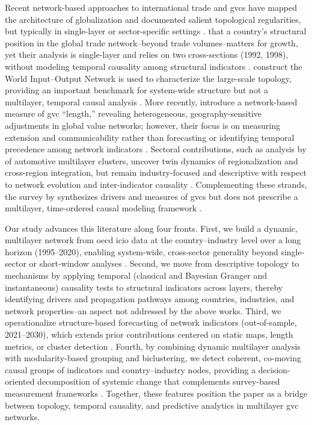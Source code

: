 \documentclass[preprint, 3p,
authoryear]{elsarticle} %
\begin{document}
Recent network-based approaches to international trade and \glspl{gvc}
have mapped the architecture of globalization and documented salient
topological regularities, but typically in single-layer or
sector-specific settings \citep{liu2025spatial}.
\citet{kali2007architecture} that a country's structural position in the
global trade network--beyond trade volumes--matters for growth, yet
their analysis is single-layer and relies on two cross-sections (1992,
1998), without modeling temporal causality among structural indicators
\citep{kali2007architecture}. \citet{cerina2015world} construct the
World Input--Output Network is used to characterize the large-scale
topology, providing an important benchmark for system-wide structure but
not a multilayer, temporal causal analysis \citep{cerina2015world}. More
recently, \citet{piccardi2024patterns} introduce a network-based measure
of \gls{gvc} ``length,'' revealing heterogeneous, geography-sensitive
adjustments in global value networks; however, their focus is on
measuring extension and communicability rather than forecasting or
identifying temporal precedence among network indicators
\citep{piccardi2024patterns}. Sectoral contributions, such as analysis
by \citet{russo2023regionalisation} of automotive multilayer clusters,
uncover twin dynamics of regionalization and cross-region integration,
but remain industry-focused and descriptive with respect to network
evolution and inter-indicator causality
\citep{russo2023regionalisation}. Complementing these strands, the
survey by \citet{amador2016global} synthesizes drivers and measures of
\glspl{gvc} but does not prescribe a multilayer, time-ordered causal
modeling framework \citep{amador2016global}.

Our study advances this literature along four fronts. First, we build a
dynamic, multilayer network from \gls{oecd} \gls{icio} data at the
country--industry level over a long horizon (1995--2020), enabling
system-wide, cross-sector generality beyond single-sector or
short-window analyses
\citep[cf.][]{russo2023regionalisation, piccardi2024patterns}. Second,
we move from descriptive topology to mechanisms by applying temporal
(classical and Bayesian Granger and instantaneous) causality tests to
structural indicators across layers, thereby identifying drivers and
propagation pathways among countries, industries, and network
properties--an aspect not addressed by the above works. Third, we
operationalize structure-based forecasting of network indicators
(out-of-sample, 2021--2030), which extends prior contributions centered
on static maps, length metrics, or cluster detection
\citep{kali2007architecture, cerina2015world, russo2023regionalisation}.
Fourth, by combining dynamic multilayer analysis with modularity-based
grouping and biclustering, we detect coherent, co-moving causal groups
of indicators and country--industry nodes, providing a decision-oriented
decomposition of systemic change that complements survey-based
measurement frameworks \citep{amador2016global}. Together, these
features position the paper as a bridge between topology, temporal
causality, and predictive analytics in multilayer \gls{gvc} networks.
\end{document}
